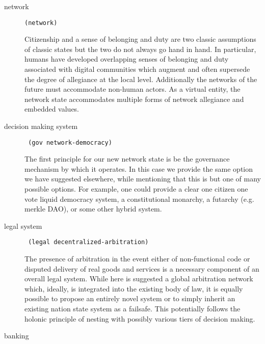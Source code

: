 \documentclass{article}
\begin{document}
\begin{description}

\item[network]

\begin{lstlisting}
(network)
\end{lstlisting}

Citizenship and a sense of belonging and duty are two classic assumptions of classic states but the two do not always go hand in hand. In particular, humans have developed overlapping senses of belonging and duty associated with digital communities which augment and often supersede the degree of allegiance at the local level. Additionally the networks of the future must accommodate non-human actors. As a virtual entity, the network state accommodates multiple forms of network allegiance and embedded values.

\item[decision making system]

\begin{lstlisting}
 (gov network-democracy)
\end{lstlisting}

The first principle for our new network state is be the governance mechanism by which it operates. In this case we provide the same option we have suggested elsewhere, while mentioning that this is but one of many possible options. For example, one could provide a clear one citizen one vote liquid democracy system, a constitutional monarchy, a futarchy (e.g. merkle DAO), or some other hybrid system. \cite{merkledao}

\item[legal system]

\begin{lstlisting}
 (legal decentralized-arbitration)
\end{lstlisting}

The presence of arbitration in the event either of non-functional code or disputed delivery of real goods and services is a necessary component of an overall legal system. While here is suggested a global arbitration network which, ideally, is integrated into the existing body of law, it is equally possible to propose an entirely novel system or to simply inherit an existing nation state system as a failsafe. This potentially follows the holonic principle of nesting with possibly various tiers of decision making.

\item[banking]


\end{description}
\end{document}
